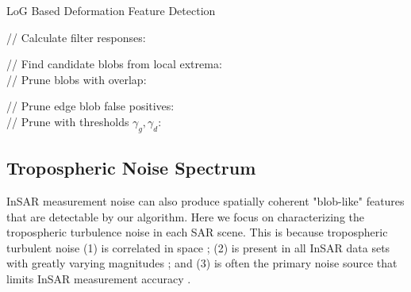 \begin{algorithm}
	\caption{LoG Based Deformation Feature Detection}\label{algo:blobs}
	\SetAlgoLined
	
	
	// Calculate filter responses:\\
	
	// Find candidate blobs from local extrema:\\
	\For{$ (i, j, m) \in  L $}{
		\If{$L[i, j, m] $ is local extremum }{
				Compute $ r = \sqrt{2}\sigma_m $ \\
				Add $ (i, j, r) $ to list of candidate detections
		}
	}
	// Prune blobs with overlap:\\
	
	// Prune edge blob false positives:\\
	// Prune with thresholds $ \gamma_g, \gamma_d $:\\
\end{algorithm}



\subsection{Tropospheric Noise Spectrum}
\label{sec:ch6-methods-2-tropo-spectrum}
InSAR measurement noise can also produce spatially coherent "blob-like" features that are detectable by our algorithm.  Here we focus on characterizing the tropospheric turbulence noise in each SAR scene. This is because tropospheric turbulent noise (1) is correlated in space \citep{Emardson2003NeutralAtmosphericDelay, Lohman2005SomeThoughtsUse}; (2) is present in all InSAR data sets with greatly varying magnitudes \citep{Barnhart2013CharacterizingEstimatingNoise, Hooper2012RecentAdvancesSar}; and (3) is often the primary noise source that limits InSAR measurement accuracy \citep{Jolivet2014ImprovingInsarGeodesy, Bekaert2015StatisticalComparisonInsar, Parker2015SystematicAssessmentAtmospheric}.

